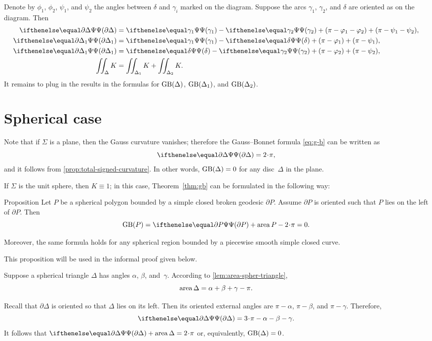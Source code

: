 Denote by $\phi_1$, $\phi_2$, $\psi_1$, and $\psi_2$ the angles between $\delta$ and $\gamma_i$ marked on the diagram.
Suppose the arcs $\gamma_1$, $\gamma_2$, and $\delta$ are oriented as on the diagram. 
Then
\begin{align*}
\tgc{\partial \Delta}&= \tgc{\gamma_1}-\tgc{\gamma_2}+(\pi-\phi_1-\phi_2)+(\pi-\psi_1-\psi_2),
\\
\tgc{\partial \Delta_1}&= \tgc{\gamma_1}-\tgc\delta+(\pi-\phi_1)+(\pi-\psi_1),
\\
\tgc{\partial \Delta_1}&= \tgc\delta-\tgc{\gamma_2}+(\pi-\phi_2)+(\pi-\psi_2),
\\
\iint_\Delta K&=\iint_{\Delta_1} K+\iint_{\Delta_2} K.
\end{align*}
It remains to plug in the results in the formulas for $\mathop{\rm GB}\nolimits(\Delta)$, $\mathop{\rm GB}\nolimits(\Delta_1)$, and $\mathop{\rm GB}\nolimits(\Delta_2)$.
\qeds

\section{Spherical case}

Note that if $\Sigma$ is a plane, then the Gauss curvature vanishes;
therefore the Gauss--Bonnet formula \ref{eq:g-b} can be written as 
\[\tgc{\partial\Delta}=2\cdot \pi,\]
and it follows from \ref{prop:total-signed-curvature}.
In other words, $\mathop{\rm GB}\nolimits(\Delta)=0$ for any disc~$\Delta$ in the plane.

If $\Sigma$ is the unit sphere, then $K\equiv1$;
in this case, Theorem~\ref{thm:gb} can be formulated in the following way:

\begin{thm}{Proposition}\label{prop:area-of-spher-polygon}
Let $P$ be a spherical polygon bounded by a simple closed broken geodesic $\partial P$.
Assume $\partial P$ is oriented such that $P$ lies on the left of $\partial P$.
Then 
\[\GB(P)=\tgc{\partial P}+\area P-2\cdot \pi=0.\]

Moreover, the same formula holds for any spherical region bounded by a piecewise smooth simple closed curve.
\end{thm}

This proposition will be used in the informal proof given below.

Suppose a spherical triangle $\Delta$ has angles 
$\alpha$, $\beta$, and~$\gamma$.
According to \ref{lem:area-spher-triangle},
\[\mathop{\rm area}\nolimits\Delta=\alpha+\beta+\gamma-\pi.\]

Recall that $\partial\Delta$ is oriented so that $\Delta$ lies on its left. 
Then its oriented external angles are  $\pi-\alpha$, $\pi-\beta$, and $\pi-\gamma$.
Therefore,
\[\tgc{\partial\Delta}=3\cdot\pi-\alpha-\beta-\gamma.\]
It follows that $\tgc{\partial\Delta}+\area \Delta=2\cdot\pi$ or, equivalently, $\mathop{\rm GB}\nolimits(\Delta)=0$.
 
